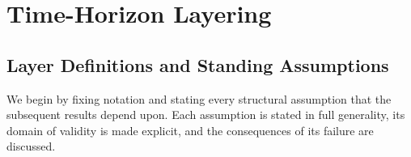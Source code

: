 \documentclass[12pt,openany]{book}
\numberwithin{equation}{chapter}
\theoremstyle{plain}
\theoremstyle{definition}
\theoremstyle{remark}
\begin{document}
\chapter{Time-Horizon Layering}
\label{ch:layering}

\section{Layer Definitions and Standing Assumptions}

\noindent We begin by fixing notation and stating every structural
assumption that the subsequent results depend upon.  Each assumption
is stated in full generality, its domain of validity is made explicit,
and the consequences of its failure are discussed.
\end{document}
